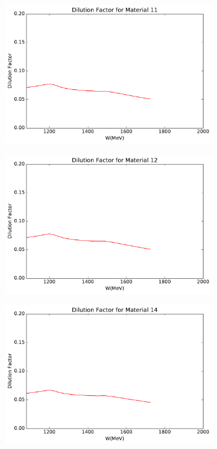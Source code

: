 \begin{figure}[h!]
  \centering
  \begin{subfigure}[t]{0.49\textwidth}
    \includegraphics[width=\textwidth]{figs/dilution-11572590-11.pdf}
  \end{subfigure}
  \begin{subfigure}[t]{0.49\textwidth}
    \includegraphics[width=\textwidth]{figs/dilution-11572590-12.pdf}
  \end{subfigure}
  \begin{subfigure}[t]{0.49\textwidth}
    \includegraphics[width=\textwidth]{figs/dilution-11572590-14.pdf}

\end{subfigure}
\end{figure}
